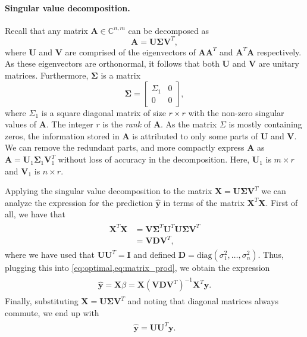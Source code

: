 \documentclass[article, a4paper, oneside, 12pt]{memoir}
\newcommand{\C}{\mathbb{C}}
\newcommand{\X}{\bm{X}}
\newcommand{\diag}[1]{\mathrm{diag}(#1)}
\newcommand{\mat}[1]{\bm{#1}}
\newcommand{\y}{\bm{y}}
\begin{document}
  \paragraph{Singular value decomposition.}
  
  Recall that any matrix \( \mat{A} \in \C^{n, m} \) can be decomposed as
  \begin{equation}
    \mat{A} = \mat{U} \mat{\Sigma}\mat{V}^T,
  \end{equation}
  where \( \mat{U} \) and \( \mat{V} \) are comprised of the eigenvectors of \(
  \mat{A}\mat{A}^T \) and \( \mat{A}^T\mat{A} \) respectively. As these
  eigenvectors are orthonormal, it follows that both \( \mat{U} \) and \(
  \mat{V} \) are unitary matrices. Furthermore, \( \mat{\Sigma} \) is a matrix 
  \begin{equation}
    \mat{\Sigma} = \begin{bmatrix}
      \Sigma_1 & 0 \\
       0 & 0
    \end{bmatrix},
  \end{equation}
  where \( \Sigma_1 \) is a square diagonal matrix of size \( r \times r \)
  with the non-zero singular values of \( \mat{A} \). The integer \( r \) is
  the \emph{rank} of \( \mat{A} \). As the matrix \( \Sigma \) is mostly
  containing zeros, the information stored in \( \mat{A} \) is attributed to
  only some parts of \( \mat{U} \) and \( \mat{V} \). We can remove the
  redundant parts, and more compactly express \( \mat{A} \) as \( \mat{A} =
  \mat{U}_1 \mat{\Sigma}_1 \mat{V}_1^T \) without loss of accuracy in the
  decomposition. Here, \( \mat{U}_1 \) is \( m \times r \) and \( \mat{V}_1 \)
  is \( n \times r \).

  Applying the singular value decomposition to the matrix \(\X = \mat{U}
  \mat{\Sigma} \mat{V}^T\) we can analyze the expression for the prediction \( \hat{\y} \)
  in terms of the matrix \( \X^T \X \).  First of all, we have that
  \begin{align}
    \begin{split}
    \X^T \X &= \mat{V}\mat{\Sigma}^T\mat{U}^T\mat{U}\mat{\Sigma} \mat{V}^T\\
            &= \mat{V}\mat{D}\mat{V}^T, 
    \end{split}
  \end{align}
  where we have used that \( \mat{U}\mat{U}^T = \mat{I} \) and defined \(
  \mat{D} = \diag{\sigma_1^2, \ldots, \sigma_n^2} \).  Thus, plugging this into
  \cref{eq:optimal,eq:matrix_prod}, we obtain the expression
  \begin{align}
    \begin{split}
      \hat{\y} = \X \beta = \X (\mat{V}\mat{D}\mat{V}^T)^{-1} \mat{X}^T \y.
    \end{split}
  \end{align}
  Finally, substituting \( \X = \mat{U}\mat{\Sigma}\mat{V}^T \) and noting that
  diagonal matrices always commute, we end up with
  \begin{align}
    \begin{split}
      \hat{\y} = \mat{U}\mat{U}^T \mat{y}.
    \end{split}
  \end{align}
\end{document}
